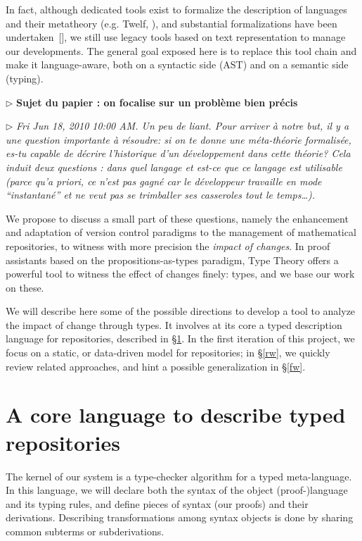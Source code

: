 \documentclass{article}
\newcommand{\remplan}[1]{\noindent\textcolor{bwblue}{$\triangleright$ \textbf{#1}}}
\newcommand{\remtext}[1]{\textcolor{bwgreen}{$\triangleright$ \textsl{#1}}}
\begin{document}
In fact, although dedicated tools exist to formalize the description
of languages and their metatheory (e.g. \textsf{Twelf},
{\cite{pfenning1999system}}), and substantial formalizations have been
undertaken~[]\cite{lee07}, we still use legacy tools
based on text representation to manage our developments. The general
goal exposed here is to replace this tool chain and make it
language-aware, both on a syntactic side (AST) and on a semantic side
(typing).

\remplan{Sujet du papier : on focalise sur un problème bien précis}

\remtext{Fri Jun 18, 2010 10:00 AM.
  Un peu de liant. Pour arriver à notre but, il y a une
  question importante à résoudre: si on te donne une méta-théorie
  formalisée, es-tu capable de décrire l'historique d'un développement
  dans cette théorie? Cela induit deux questions : dans quel langage
  et est-ce que ce langage est utilisable (parce qu'a priori, ce n'est
  pas gagné car le développeur travaille en mode ``instantané'' et ne
  veut pas se trimballer ses casseroles tout le temps\ldots).}

We propose to discuss a small part of these questions, namely the
enhancement and adaptation of version control paradigms to the
management of mathematical repositories, to witness with more
precision the \emph{impact of changes}. In proof assistants based on
the propositions-as-types paradigm, Type Theory offers a powerful tool
to witness the effect of changes finely: types, and we base our work
on these.

We will describe here some of the possible directions to develop a
tool to analyze the impact of change through types. It involves at its
core a typed description language for repositories, described in
\S\ref{kernel}. In the first iteration of this project, we focus on a
static, or data-driven model for repositories; in \S\ref{rw}, we
quickly review related approaches, and hint a possible generalization
in \S\ref{fw}.

\section{A core language to describe typed repositories}
\label{kernel}

The kernel of our system is a type-checker algorithm for a typed
meta-language. In this language, we will declare both the syntax of
the object (proof-)language and its typing rules, and define pieces of
syntax (our proofs) and their derivations. Describing transformations
among syntax objects is done by sharing common subterms or
subderivations.
\end{document}
